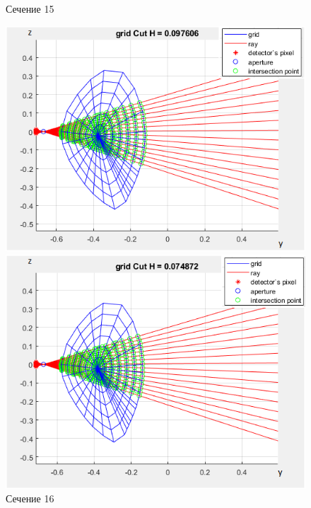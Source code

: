 \documentclass[a4]{article}
\begin{document}
\begin{figure}[H]
\begin{center}
\caption{Сечение 15}
\includegraphics{pic20.png} 

\caption{Сечение 16}
\includegraphics{pic21.png} 
\end{center}
\end{figure}
\end{document}
